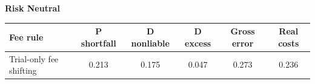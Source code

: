 \documentclass[10pt,border=5pt,varwidth=17cm]{standalone}
\begin{document}
\begingroup
\small
\setlength{\tabcolsep}{5pt}
\renewcommand{\arraystretch}{1.20}
\noindent\textbf{Risk Neutral}\par\smallskip
\noindent\begin{tabularx}{\linewidth}{@{}>{\raggedright\arraybackslash}Xccccc@{}}
\toprule
\textbf{Fee rule} & \textbf{P shortfall} & \textbf{D nonliable} & \textbf{D excess} & \textbf{Gross error} & \textbf{Real costs} \\
\midrule
Trial-only fee shifting & 0.213 & 0.175 & 0.047 & 0.273 & 0.236 \\
\bottomrule\end{tabularx}\par\medskip
\endgroup
\end{document}
